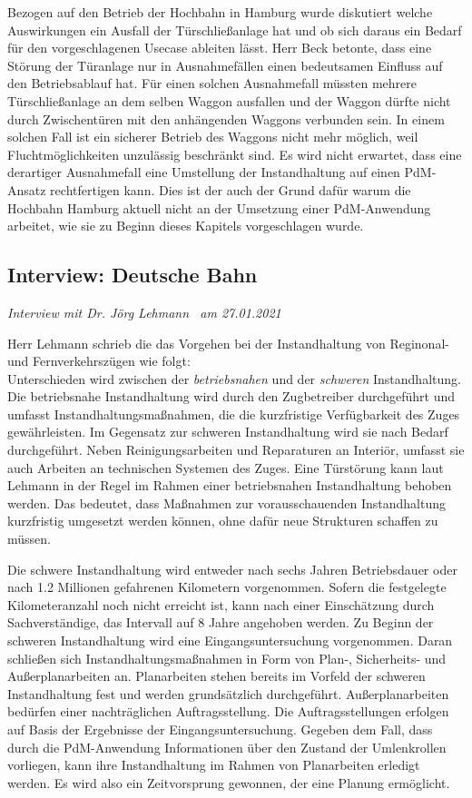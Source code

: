 Bezogen auf den Betrieb der Hochbahn in Hamburg wurde diskutiert welche Auswirkungen ein Ausfall der Türschließanlage hat und ob sich daraus ein Bedarf für den vorgeschlagenen Usecase ableiten lässt. Herr Beck betonte, dass eine Störung der Türanlage nur in Ausnahmefällen einen bedeutsamen Einfluss auf den Betriebsablauf hat. Für einen solchen Ausnahmefall müssten mehrere Türschließanlage an dem selben Waggon ausfallen und der Waggon dürfte nicht durch Zwischentüren mit den anhängenden Waggons verbunden sein. In einem solchen Fall ist ein sicherer Betrieb des Waggons nicht mehr möglich, weil Fluchtmöglichkeiten unzulässig beschränkt sind. Es wird nicht erwartet, dass eine derartiger Ausnahmefall eine Umstellung der Instandhaltung auf einen PdM-Ansatz rechtfertigen kann. Dies ist der auch der Grund dafür warum die Hochbahn Hamburg aktuell nicht an der Umsetzung einer PdM-Anwendung arbeitet, wie sie zu Beginn dieses Kapitels vorgeschlagen wurde.
\subsection{Interview: Deutsche Bahn}
\label{subsec:interview_deutsche_bahn}
\textit{Interview mit Dr. Jörg Lehmann~\cite{db.2021} am {27.01.2021}}

Herr Lehmann schrieb die das Vorgehen bei der Instandhaltung von Reginonal- und Fernverkehrszügen wie folgt:\\
Unterschieden wird zwischen der \textit{betriebsnahen} und der \textit{schweren} Instandhaltung. Die betriebsnahe Instandhaltung wird durch den Zugbetreiber durchgeführt und umfasst Instandhaltungsmaßnahmen, die die kurzfristige Verfügbarkeit des Zuges gewährleisten. Im Gegensatz zur schweren Instandhaltung wird sie nach Bedarf durchgeführt. Neben Reinigungsarbeiten und Reparaturen an Interiör, umfasst sie auch Arbeiten an technischen Systemen des Zuges. Eine Türstörung kann laut Lehmann in der Regel im Rahmen einer betriebsnahen Instandhaltung behoben werden. Das bedeutet, dass Maßnahmen zur vorausschauenden Instandhaltung kurzfristig umgesetzt werden können, ohne dafür neue Strukturen schaffen zu müssen.

Die schwere Instandhaltung wird entweder nach sechs Jahren Betriebsdauer oder nach \num{1.2} Millionen gefahrenen Kilometern vorgenommen. Sofern die festgelegte Kilometeranzahl noch nicht erreicht ist, kann nach einer Einschätzung durch Sachverständige, das Intervall	auf \num{8} Jahre angehoben werden. Zu Beginn der schweren Instandhaltung wird eine Eingangsuntersuchung vorgenommen. Daran schließen sich Instandhaltungsmaßnahmen in Form von Plan-, Sicherheits- und Außerplanarbeiten an. Planarbeiten stehen bereits im Vorfeld der schweren Instandhaltung fest und werden grundsätzlich durchgeführt. Außerplanarbeiten bedürfen einer nachträglichen Auftragsstellung. Die Auftragsstellungen erfolgen auf Basis der Ergebnisse der Eingangsuntersuchung. Gegeben dem Fall, dass durch die PdM-Anwendung Informationen über den Zustand der Umlenkrollen vorliegen, kann ihre Instandhaltung im Rahmen von Planarbeiten erledigt werden. Es wird also ein Zeitvorsprung gewonnen, der eine Planung ermöglicht.

